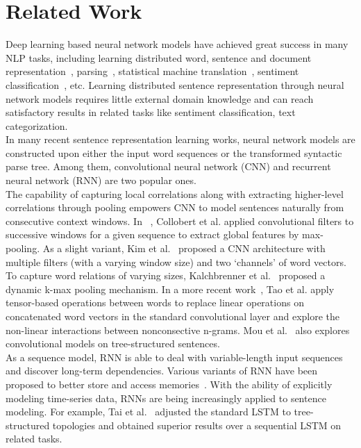 \documentclass[11pt,letterpaper]{article}
\begin{document}
\section{Related Work}
Deep learning based neural network models have achieved great success in
many NLP tasks, including learning distributed word, sentence
and document representation~\cite{wordrep,pv}, parsing~\cite{parsing},
statistical machine translation~\cite{smt}, sentiment
classification~\cite{kim}, etc.
Learning distributed sentence representation through neural network
models requires little external domain knowledge and can reach
satisfactory results in related tasks like sentiment classification,
text categorization.\\
\indent In many recent sentence representation learning works, neural
network models are constructed upon either the input word sequences or
the transformed syntactic parse tree. Among them,
convolutional neural network (CNN) and recurrent neural network (RNN)
are two popular ones. \\
\indent The capability of capturing local correlations along with
extracting higher-level correlations through pooling empowers CNN to
model sentences naturally from consecutive context windows. In
~\cite{scratch}, Collobert et al. applied convolutional filters to
successive windows for a given sequence to extract global features by
max-pooling. As a slight variant, Kim et al.~ proposed a
CNN architecture with multiple filters (with a varying window size) and
two `channels' of word vectors. To capture word relations of varying
sizes, Kalchbrenner et al.~ proposed a dynamic k-max
pooling mechanism. In a more recent work~\cite{tao}, Tao et al. apply
tensor-based operations between words to replace linear operations on
concatenated word vectors in the standard convolutional layer and explore the non-linear interactions between nonconsective n-grams. Mou
et al.~ also explores convolutional models on
tree-structured sentences. \\
\indent As a sequence model, RNN is able to deal with variable-length
input sequences and discover long-term dependencies. Various variants of
RNN have been proposed to better store and access
memories~\cite{lstm,gru}. With the ability of explicitly modeling
time-series data, RNNs are being increasingly applied to sentence
modeling. For example, Tai et al.~ adjusted the
standard LSTM to tree-structured topologies and obtained superior results
over a sequential LSTM on related tasks.\\
\end{document}
